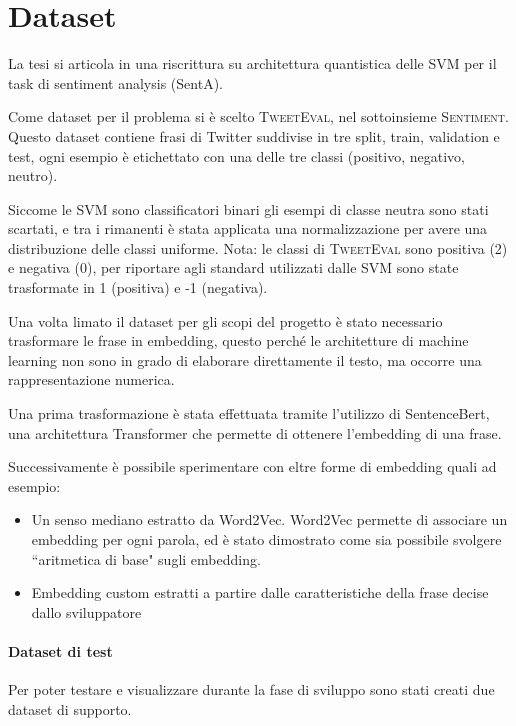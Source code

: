 \documentclass[12pt]{article}
\begin{document}
\section{Dataset}

La tesi si articola in una riscrittura su architettura quantistica delle SVM per il task di sentiment analysis (SentA).

Come dataset per il problema si è scelto \textsc{TweetEval}, nel sottoinsieme \textsc{Sentiment}.
Questo dataset contiene frasi di Twitter suddivise in tre split, train, validation e test, 
ogni esempio è etichettato con una delle tre classi (positivo, negativo, neutro).

Siccome le SVM sono classificatori binari gli esempi di classe neutra sono stati scartati, 
e tra i rimanenti è stata applicata una normalizzazione per avere una distribuzione delle classi uniforme.
Nota: le classi di \textsc{TweetEval} sono positiva (2) e negativa (0), 
per riportare agli standard utilizzati dalle SVM sono state trasformate in 1 (positiva) e -1 (negativa).

Una volta limato il dataset per gli scopi del progetto è stato necessario trasformare le frase in embedding,
questo perché le architetture di machine learning non sono in grado di elaborare direttamente il testo, ma occorre una rappresentazione numerica.

Una prima trasformazione è stata effettuata tramite l'utilizzo di SentenceBert, 
una architettura Transformer che permette di ottenere l'embedding di una frase.

Successivamente è possibile sperimentare con eltre forme di embedding quali ad esempio:
\begin{itemize}
    \item Un senso mediano estratto da Word2Vec. Word2Vec permette di associare un embedding per ogni parola, ed è stato dimostrato come sia possibile svolgere “aritmetica di base" sugli embedding.
    \item Embedding custom estratti a partire dalle caratteristiche della frase decise dallo sviluppatore
\end{itemize}

\paragraph{Dataset di test}
Per poter testare e visualizzare durante la fase di sviluppo sono stati creati due dataset di supporto.
\end{document}
